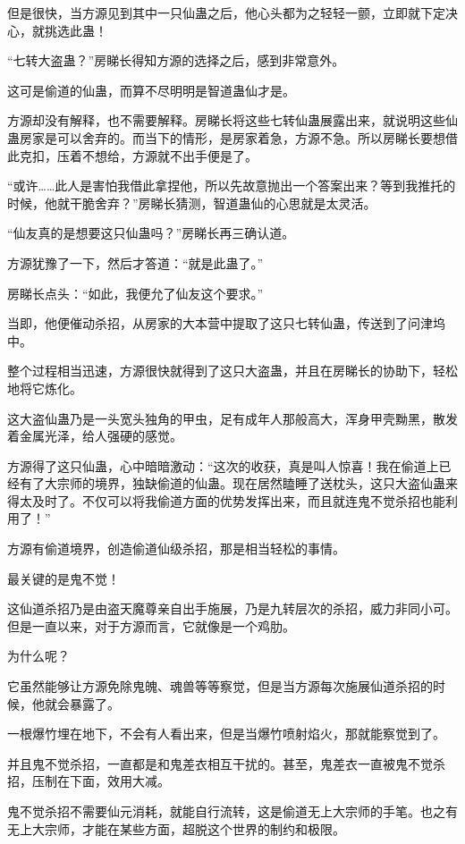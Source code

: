 \begin{this_body}
但是很快，当方源见到其中一只仙蛊之后，他心头都为之轻轻一颤，立即就下定决心，就挑选此蛊！

“七转大盗蛊？”房睇长得知方源的选择之后，感到非常意外。

这可是偷道的仙蛊，而算不尽明明是智道蛊仙才是。

方源却没有解释，也不需要解释。房睇长将这些七转仙蛊展露出来，就说明这些仙蛊房家是可以舍弃的。而当下的情形，是房家着急，方源不急。所以房睇长要想借此克扣，压着不想给，方源就不出手便是了。

“或许……此人是害怕我借此拿捏他，所以先故意抛出一个答案出来？等到我推托的时候，他就干脆舍弃？”房睇长猜测，智道蛊仙的心思就是太灵活。

“仙友真的是想要这只仙蛊吗？”房睇长再三确认道。

方源犹豫了一下，然后才答道：“就是此蛊了。”

房睇长点头：“如此，我便允了仙友这个要求。”

当即，他便催动杀招，从房家的大本营中提取了这只七转仙蛊，传送到了问津坞中。

整个过程相当迅速，方源很快就得到了这只大盗蛊，并且在房睇长的协助下，轻松地将它炼化。

这大盗仙蛊乃是一头宽头独角的甲虫，足有成年人那般高大，浑身甲壳黝黑，散发着金属光泽，给人强硬的感觉。

方源得了这只仙蛊，心中暗暗激动：“这次的收获，真是叫人惊喜！我在偷道上已经有了大宗师的境界，独缺偷道的仙蛊。现在居然瞌睡了送枕头，这只大盗仙蛊来得太及时了。不仅可以将我偷道方面的优势发挥出来，而且就连鬼不觉杀招也能利用了！”

方源有偷道境界，创造偷道仙级杀招，那是相当轻松的事情。

最关键的是鬼不觉！

这仙道杀招乃是由盗天魔尊亲自出手施展，乃是九转层次的杀招，威力非同小可。但是一直以来，对于方源而言，它就像是一个鸡肋。

为什么呢？

它虽然能够让方源免除鬼魄、魂兽等等察觉，但是当方源每次施展仙道杀招的时候，他就会暴露了。

一根爆竹埋在地下，不会有人看出来，但是当爆竹喷射焰火，那就能察觉到了。

并且鬼不觉杀招，一直都是和鬼差衣相互干扰的。甚至，鬼差衣一直被鬼不觉杀招，压制在下面，效用大减。

鬼不觉杀招不需要仙元消耗，就能自行流转，这是偷道无上大宗师的手笔。也之有无上大宗师，才能在某些方面，超脱这个世界的制约和极限。


\end{this_body}
